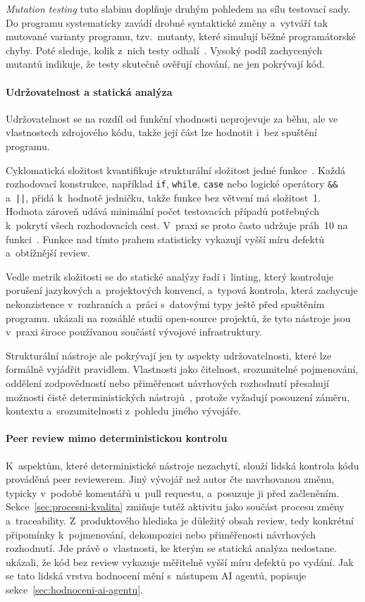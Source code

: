 \textit{Mutation testing} tuto slabinu doplňuje druhým pohledem na
sílu testovací sady. Do programu systematicky zavádí drobné syntaktické
změny a~vytváří tak mutované varianty programu, tzv.~mutanty, které
simulují běžné programátorské chyby. Poté sleduje, kolik z~nich testy
odhalí~\cite{papadakis2019}. Vysoký podíl zachycených mutantů indikuje,
že testy skutečně ověřují chování, ne jen pokrývají kód.

\paragraph{Udržovatelnost a statická analýza}
Udržovatelnost se na rozdíl od funkční vhodnosti neprojevuje za
běhu, ale ve vlastnostech zdrojového kódu, takže její část lze
hodnotit i~bez spuštění programu.

Cyklomatická složitost kvantifikuje strukturální složitost jedné
funkce~\cite{mccabe1976}. Každá rozhodovací konstrukce, například
\texttt{if}, \texttt{while}, \texttt{case} nebo logické operátory
\texttt{\&\&} a~\texttt{||}, přidá k~hodnotě jedničku, takže funkce
bez větvení má složitost~1. Hodnota zároveň udává minimální počet
testovacích případů potřebných k~pokrytí všech rozhodovacích cest.
V~praxi se proto často udržuje práh~10 na funkci~\cite{mcconnell2004}.
Funkce nad tímto prahem statisticky vykazují vyšší míru defektů
a~obtížnější review.

Vedle metrik složitosti se do statické analýzy řadí i~linting, který
kontroluje porušení jazykových a~projektových konvencí, a~typová
kontrola, která zachycuje nekonzistence v~rozhraních a~práci
s~datovými typy ještě před spuštěním programu. \textcite{beller2016}
ukázali na rozsáhlé studii open-source
projektů, že tyto nástroje jsou v~praxi široce používanou součástí
vývojové infrastruktury.

Strukturální nástroje ale pokrývají jen ty aspekty udržovatelnosti,
které lze formálně vyjádřit pravidlem. Vlastnosti jako čitelnost,
srozumitelné pojmenování, oddělení zodpovědností nebo přiměřenost
návrhových rozhodnutí přesahují možnosti čistě deterministických
nástrojů~\cite{mcconnell2004}, protože vyžadují posouzení záměru,
kontextu a~srozumitelnosti z~pohledu jiného vývojáře.

\paragraph{Peer review mimo deterministickou kontrolu}
K~aspektům, které deterministické nástroje nezachytí, slouží lidská
kontrola kódu prováděná peer reviewerem. Jiný vývojář než autor čte
navrhovanou změnu, typicky v~podobě komentářů u~pull requestu, a~posuzuje
ji před začleněním. Sekce~\ref{sec:procesni-kvalita} zmiňuje tutéž
aktivitu jako součást procesu změny a~traceability. Z~produktového
hlediska je důležitý obsah review, tedy konkrétní připomínky
k~pojmenování, dekompozici nebo přiměřenosti návrhových rozhodnutí.
Jde právě o~vlastnosti, ke kterým se statická analýza nedostane.
\textcite{mcintosh2016} ukázali, že kód bez review vykazuje měřitelně
vyšší míru defektů po vydání. Jak se tato lidská vrstva
hodnocení mění s~nástupem AI agentů, popisuje
sekce~\ref{sec:hodnoceni-ai-agentu}.

